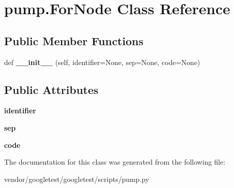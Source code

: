 \hypertarget{classpump_1_1_for_node}{}\section{pump.\+For\+Node Class Reference}
\label{classpump_1_1_for_node}
\subsection*{Public Member Functions}
\begin{DoxyCompactItemize}
\item 
\mbox{\label{classpump_1_1_for_node_a9cf60468cacdb06acce35074ab2a2b55}} 
def {\bfseries \+\_\+\+\_\+init\+\_\+\+\_\+} (self, identifier=None, sep=None, code=None)
\end{DoxyCompactItemize}
\subsection*{Public Attributes}
\begin{DoxyCompactItemize}
\item 
\mbox{\label{classpump_1_1_for_node_a2444199e135e43696b3a006bd0d38982}} 
{\bfseries identifier}
\item 
\mbox{\label{classpump_1_1_for_node_a06b493278b3c1ad53363a2bcc3b8efb3}} 
{\bfseries sep}
\item 
\mbox{\label{classpump_1_1_for_node_afdb5f4f2a3bc772bbc6ea777dfde898e}} 
{\bfseries code}
\end{DoxyCompactItemize}


The documentation for this class was generated from the following file\+:\begin{DoxyCompactItemize}
\item 
vendor/googletest/googletest/scripts/pump.\+py\end{DoxyCompactItemize}
